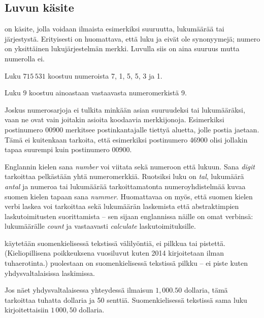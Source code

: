 \subsection*{Luvun käsite}

 on käsite, jolla voidaan ilmaista esimerkiksi suuruutta, lukumäärää tai järjestystä. Erityisesti on huomattava, että luku ja  eivät ole synonyymejä; numero on yksittäinen lukujärjestelmän merkki. Luvulla siis on aina suuruus mutta numerolla ei.

\begin{esimerkki}
	Luku $715\,531$ koostuu numeroista 7, 1, 5, 5, 3 ja 1.
	
	Luku $9$ koostuu ainoastaan vastaavasta numeromerkistä 9.
\end{esimerkki}

Joskus numerosarjoja ei tulkita minkään asian suuruudeksi tai lukumääräksi, vaan ne ovat vain joitakin asioita koodaavia merkkijonoja. Esimerkiksi postinumero 00900 merkitsee postinkantajalle tiettyä aluetta, jolle postia jaetaan. Tämä ei kuitenkaan tarkoita, että esimerkiksi postinumero 46900 olisi jollakin tapaa suurempi kuin postinumero 00900.

Englannin kielen sana \textit{number} voi viitata sekä numeroon että lukuun. Sana \textit{digit} tarkoittaa pelkästään yhtä numeromerkkiä. Ruotsiksi luku on \textit{tal}, lukumäärä \textit{antal} ja numeroa tai lukumäärää tarkoittamatonta numeroyhdistelmää kuvaa suomen kielen tapaan sana \textit{nummer}. Huomattavaa on myös, että suomen kielen verbi laskea voi tarkoittaa sekä lukumäärän laskemista että abstraktimpien laskutoimitusten suorittamista – sen sijaan englannissa näille on omat verbinsä: lukumäärälle \textit{count} ja vastaavasti \textit{calculate} laskutoimituksille.

 käytetään suomenkielisessä tekstissä välilyöntiä, ei pilkkua tai pistettä. (Kieliopillisena poikkeuksena vuosiluvut kuten 2014 kirjoitetaan ilman tuhaerotinta.)  puolestaan on suomenkielisessä tekstissä pilkku -- ei piste kuten yhdysvaltalaisissa laskimissa.

\begin{esimerkki}
Jos näet yhdysvaltalaisessa yhteydessä ilmaisun $1,000.50$ dollaria, tämä tarkoittaa tuhatta dollaria ja 50 senttiä. Suomenkielisessä tekstissä sama luku kirjoitettaisiin $1\,000,50$ dollaria.
\end{esimerkki}

